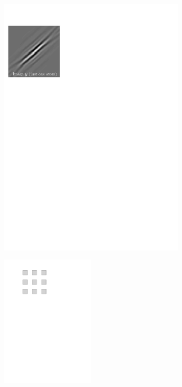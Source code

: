 \begin{figure}[!ht]\centering
\begin{subfigure}[b]{0.32\textwidth}\centering
	\includegraphics[width=\textwidth]{figures/manual-better-support/target.pdf}
	\caption{}\label{fig_fixed_vs_expected_y}
\end{subfigure}
\begin{subfigure}[b]{0.32\textwidth}\centering
	\includegraphics[width=0.5\textwidth]{figures/manual-better-support/support.pdf}

\end{subfigure}
\end{figure}
